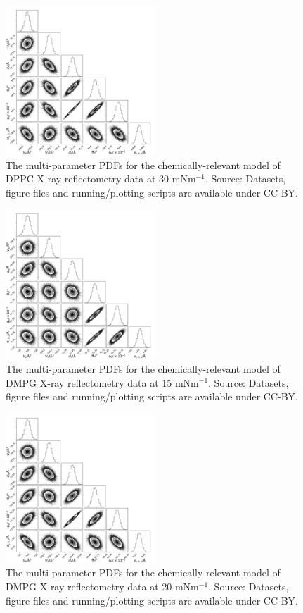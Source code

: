 \documentclass[11pt,a4paper]{article}
\begin{document}
\begin{figure}
	\centering
	\includegraphics[width=0.50\textwidth]{figures/dppc4_all_corner}
	\caption{The multi-parameter PDFs for the chemically-relevant model of DPPC X-ray reflectometry data at 30 mNm$^{-1}$. Source: Datasets, figure files and running/plotting scripts are available under CC-BY.\cite{mccluskey_2018}}
	\label{fig:dppc5}
\end{figure}
\begin{figure}[h]
	\centering
	\includegraphics[width=0.50\textwidth]{figures/dmpg1_all_corner}
	\caption{The multi-parameter PDFs for the chemically-relevant model of DMPG X-ray reflectometry data at 15 mNm$^{-1}$. Source: Datasets, figure files and running/plotting scripts are available under CC-BY.\cite{mccluskey_2018}}
	\label{fig:dmpg2}
\end{figure}
\begin{figure}[h]
	\centering
	\includegraphics[width=0.50\textwidth]{figures/dmpg2_all_corner}
	\caption{The multi-parameter PDFs for the chemically-relevant model of DMPG X-ray reflectometry data at 20 mNm$^{-1}$. Source: Datasets, figure files and running/plotting scripts are available under CC-BY.\cite{mccluskey_2018}}
	\label{fig:dmpg3}
\end{figure}
\end{document}
